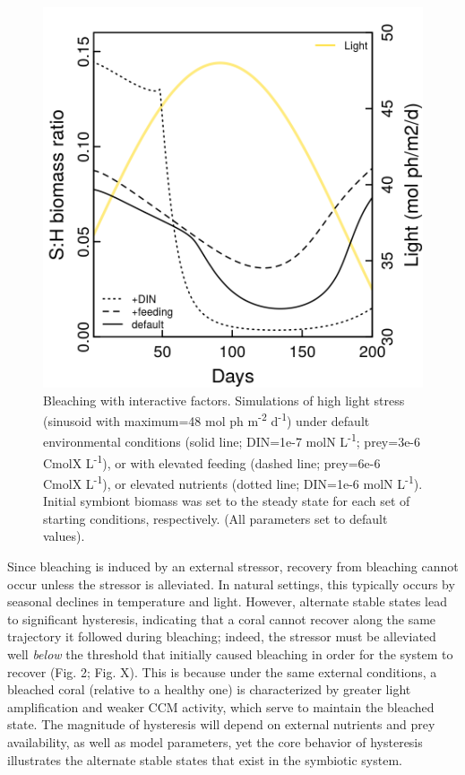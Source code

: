 \documentclass[]{elsarticle} %
\makeatletter
\def\maxwidth{\ifdim\Gin@nat@width>\linewidth\linewidth
\else\Gin@nat@width\fi}
\let\Oldincludegraphics\includegraphics
\renewcommand{\includegraphics}[1]{\Oldincludegraphics[width=\maxwidth]{#1}}
\makeatother
\begin{document}
\begin{figure}[htbp]
\centering
\includegraphics{../img/Fig7.png}
\caption{Bleaching with interactive factors. Simulations of high light
stress (sinusoid with maximum=48 mol ph m\textsuperscript{-2}
d\textsuperscript{-1}) under default environmental conditions (solid
line; DIN=1e-7 molN L\textsuperscript{-1}; prey=3e-6 CmolX
L\textsuperscript{-1}), or with elevated feeding (dashed line; prey=6e-6
CmolX L\textsuperscript{-1}), or elevated nutrients (dotted line;
DIN=1e-6 molN L\textsuperscript{-1}). Initial symbiont biomass was set
to the steady state for each set of starting conditions, respectively.
(All parameters set to default values).}
\end{figure}

Since bleaching is induced by an external stressor, recovery from
bleaching cannot occur unless the stressor is alleviated. In natural
settings, this typically occurs by seasonal declines in temperature and
light. However, alternate stable states lead to significant hysteresis,
indicating that a coral cannot recover along the same trajectory it
followed during bleaching; indeed, the stressor must be alleviated well
\emph{below} the threshold that initially caused bleaching in order for
the system to recover (Fig. 2; Fig. X). This is because under the same
external conditions, a bleached coral (relative to a healthy one) is
characterized by greater light amplification and weaker CCM activity,
which serve to maintain the bleached state. The magnitude of hysteresis
will depend on external nutrients and prey availability, as well as
model parameters, yet the core behavior of hysteresis illustrates the
alternate stable states that exist in the symbiotic system.
\end{document}
